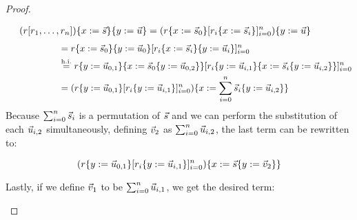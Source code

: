 \begin{proof}
\begin{enumerate}
\begin{equation*}\begin{split}
  (r [r_1,\hdots,r_n])\{x := \vec{s}\}\{y := \vec{u}\}
     & = (r\{x := \vec{s}_0\} [r_i\{x := \vec{s}_i\}]_{i=0}^n)\{y := \vec{u}\} \hspace{1cm}\\
\end{split}\end{equation*}
\begin{equation*}\begin{split}
\hspace{2cm} & = r\{x := \vec{s}_0\}\{y := \vec{u}_0\}
               [r_i\{x := \vec{s}_i\}\{y := \vec{u}_i\}]_{i=0}^n \\
     & \overset{\mathrm{h.i.}}{=} r\{y := \vec{u}_{0,1}\}\{x := \vec{s}_0\{y := \vec{u}_{0,2}\}\}
            [r_i\{y := \vec{u}_{i,1}\}\{x := \vec{s}_i\{y := \vec{u}_{i,2}\}\}]_{i=0}^n \\
     & = (r\{y := \vec{u}_{0,1}\}
                     [r_i\{y := \vec{u}_{i,1}\}]_{i=0}^n)\{x := \sum_{i=0}^n \vec{s}_i\{y := \vec{u}_{i,2}\}\} \\
\end{split}\end{equation*}
\noindent Because $\sum_{i=0}^n \vec{s}_i$ is a permutation of $\vec{s}$ and
we can perform the substitution of each $\vec{u}_{i,2}$ simultaneously, defining
$\vec{v}_2$ as $\sum_{i=0}^n \vec{u}_{i,2}$, the last term can be rewritten to:

\[
  (r\{y := \vec{u}_{0,1}\}
           [r_i\{y := \vec{u}_{i,1}\}]_{i=0}^n)\{x := \vec{s}\{y := \vec{v}_2\}\} \\
\]

\noindent Lastly, if we define $\vec{v}_1$ to be $\sum_{i=0}^n \vec{u}_{i,1}$,
we get the desired term:


\end{enumerate}
\end{proof}
